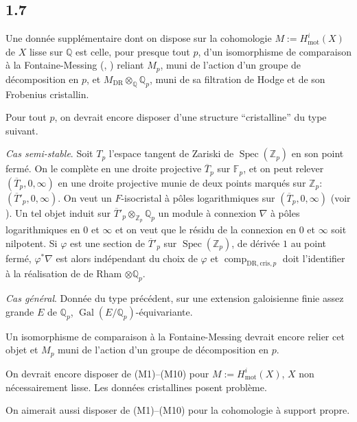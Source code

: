 \documentclass[12pt,a4paper]{article}
\theoremstyle{plain}
\theoremstyle{definition}
\theoremstyle{remark}
\DeclareMathOperator{\Spec}{Spec}
\DeclareMathOperator{\Gal}{Gal}
\newcommand{\mot}{\mathrm{mot}}
\providecommand{\Gal}{\operatorname{Gal}}
\providecommand{\Spec}{\operatorname{Spec}}
\providecommand{\mot}{\mathrm{mot}}
\providecommand{\DR}{\mathrm{DR}}
\providecommand{\cris}{\mathrm{cris}}
\providecommand{\comp}{\operatorname{comp}}
\begin{document}
\subsection*{1.7}

Une donn\'ee suppl\'ementaire dont on dispose sur la cohomologie $M := H^i_\mot(X)$ de
$X$ lisse sur $\mathbb{Q}$ est celle, pour presque tout $p$, d'un isomorphisme de
comparaison \`a la Fontaine-Messing (\cite{FM}, \cite{Fa}) reliant $M_p$, muni de l'action
d'un groupe de d\'ecomposition en $p$, et $M_{\DR} \otimes_{\mathbb{Q}} \mathbb{Q}_p$, muni de
sa filtration de Hodge et de son Frobenius cristallin.

Pour tout $p$, on devrait encore disposer d'une structure ``cristalline'' du type suivant.

\emph{Cas semi-stable}. Soit $T_p$ l'espace tangent de Zariski de $\Spec(\mathbb{Z}_p)$ en
son point ferm\'e. On le compl\`ete en une droite projective $\overline{T}_p$ sur
$\mathbb{F}_p$, et on peut relever $(\overline{T}_p, 0, \infty)$ en une droite projective
munie de deux points marqu\'es sur $\mathbb{Z}_p$: $(\overline{T}'_p, 0, \infty)$. On veut
un $F$-isocristal \`a p\^oles logarithmiques sur $(\overline{T}_p, 0, \infty)$ (voir
\cite{Fa}). Un tel objet induit sur $\overline{T}'_p \otimes_{\mathbb{Z}_p} \mathbb{Q}_p$ un
module \`a connexion $\nabla$ \`a p\^oles logarithmiques en $0$ et $\infty$ et on veut que
le r\'esidu de la connexion en $0$ et $\infty$ soit nilpotent. Si $\varphi$ est une section
de $\overline{T}'_p$ sur $\Spec(\mathbb{Z}_p)$, de d\'eriv\'ee $1$ au point ferm\'e,
$\varphi^*\nabla$ est alors ind\'ependant du choix de $\varphi$ et
$\comp_{\DR,\cris,p}$ doit l'identifier \`a la r\'ealisation de de Rham $\otimes
\mathbb{Q}_p$.

\emph{Cas g\'en\'eral}. Donn\'ee du type pr\'ec\'edent, sur une extension galoisienne finie
assez grande $E$ de $\mathbb{Q}_p$, $\Gal(E/\mathbb{Q}_p)$-\'equivariante.

Un isomorphisme de comparaison \`a la Fontaine-Messing devrait encore relier cet objet
et $M_p$ muni de l'action d'un groupe de d\'ecomposition en $p$.

\begin{variante}[1.8]
On devrait encore disposer de (M1)--(M10) pour $M := H^i_\mot(X)$, $X$ non
n\'ecessairement lisse. Les donn\'ees cristallines posent probl\`eme.

On aimerait aussi disposer de (M1)--(M10) pour la cohomologie \`a support propre.
\end{variante}
\end{document}
